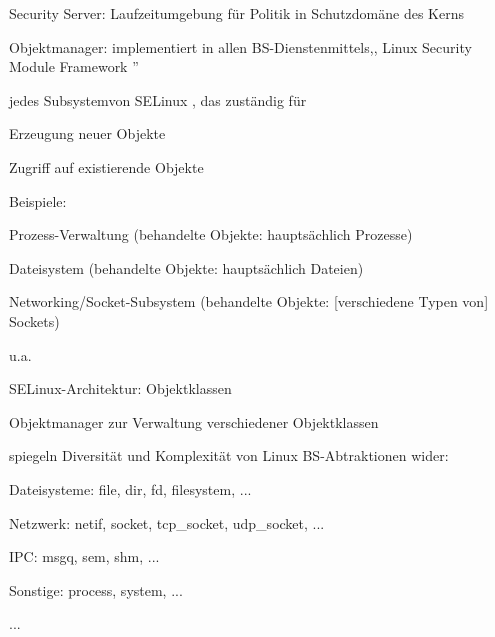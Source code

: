 \documentclass[a4paper]{article}
\begin{document}
\begin{multicols}{3}
    \begin{itemize*}
        \item
        Security Server: Laufzeitumgebung für Politik in Schutzdomäne des
        Kerns
        \item
        Objektmanager: implementiert in allen BS-Dienstenmittels,, Linux
        Security Module Framework ''
        \begin{itemize*}
            \item jedes Subsystemvon SELinux , das zuständig für \begin{enumerate*} \item Erzeugung neuer Objekte \item Zugriff auf existierende Objekte \end{enumerate*}
            \item Beispiele: \begin{enumerate*} \item Prozess-Verwaltung (behandelte Objekte: hauptsächlich Prozesse) \item Dateisystem (behandelte Objekte: hauptsächlich Dateien) \item Networking/Socket-Subsystem (behandelte Objekte: [verschiedene Typen von] Sockets) \item u.a. \end{enumerate*}
        \end{itemize*}
    \end{itemize*}

    SELinux-Architektur: Objektklassen

    \begin{itemize*}
        \item
        Objektmanager zur Verwaltung verschiedener Objektklassen
        \item
        spiegeln Diversität und Komplexität von Linux BS-Abtraktionen wider:
        \begin{itemize*}
            \item Dateisysteme: file, dir, fd, filesystem, ...
            \item Netzwerk: netif, socket, tcp\_socket, udp\_socket, ...
            \item IPC: msgq, sem, shm, ...
            \item Sonstige: process, system, ...
            \item ...
        \end{itemize*}
    \end{itemize*}


\end{multicols}
\end{document}
